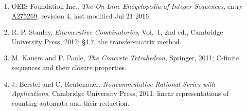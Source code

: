 \documentclass[11pt]{article}
\theoremstyle{definition}
\begin{document}
\begin{enumerate}

\item OEIS Foundation Inc., \emph{The On-Line Encyclopedia of Integer Sequences}, entry \href{https://oeis.org/A275269}{A275269}, revision 4, last modified Jul 21 2016.

\item R. P. Stanley, \emph{Enumerative Combinatorics}, Vol.~1, 2nd ed., Cambridge University Press, 2012; \S4.7, the transfer-matrix method.

\item M. Kauers and P. Paule, \emph{The Concrete Tetrahedron}, Springer, 2011; C-finite sequences and their closure properties.

\item J. Berstel and C. Reutenauer, \emph{Noncommutative Rational Series with Applications}, Cambridge University Press, 2011; linear representations of counting automata and their reduction.

\end{enumerate}
\end{document}
